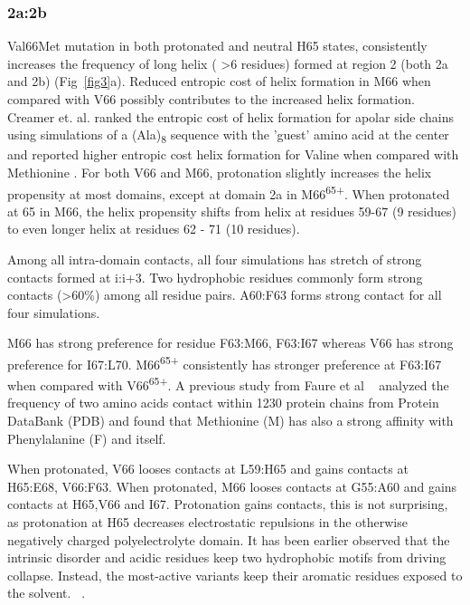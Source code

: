 \documentclass[journal=jacsat,manuscript=article]{achemso}
\begin{document}
\subsubsection{2a:2b}
Val66Met mutation in both protonated and neutral H65 states, consistently increases the frequency of long helix ( \textgreater 6 residues) formed at region 2 (both 2a and 2b) (Fig~\ref{fig3}a). 
Reduced entropic cost of helix formation in M66 when compared with V66 possibly contributes to the increased helix formation. Creamer et. al. ranked the entropic cost of helix formation for apolar side chains using simulations of a (Ala)\textsubscript{8} sequence with the 'guest' amino acid at the center and reported higher entropic cost helix formation for Valine when compared with Methionine \cite{Creamer1992}. 
For both V66 and M66, protonation slightly increases the helix propensity at most domains, except at domain 2a in M66\textsuperscript{65+}. 
When protonated at 65 in M66, the helix propensity shifts from helix at residues 59-67 (9 residues) to  even longer helix at residues 62 - 71 (10 residues).

Among all intra-domain contacts, all four simulations has stretch of strong contacts formed at i:i+3. Two hydrophobic residues commonly form strong contacts (\textgreater 60\%) among all residue pairs. A60:F63 forms strong contact for all four simulations. 

M66 has strong preference for residue F63:M66, F63:I67 whereas V66 has strong preference for I67:L70. M66\textsuperscript{65+} consistently has stronger preference at F63:I67 when compared with V66\textsuperscript{65+}.  A previous study from Faure et al ~\cite {Faure2008} analyzed the frequency of two amino acids contact within 1230 protein chains from Protein DataBank (PDB) and found that Methionine (M) has also a strong affinity with Phenylalanine (F) and itself.

When protonated, V66 looses contacts at L59:H65 and gains contacts at H65:E68, V66:F63. When protonated, M66 looses contacts at G55:A60 and gains contacts at H65,V66 and I67. Protonation gains contacts, this is not surprising, as protonation at H65 decreases electrostatic repulsions in the otherwise negatively charged polyelectrolyte domain. It has been earlier observed that  the intrinsic disorder and acidic residues keep two hydrophobic motifs from driving collapse. Instead, the most-active variants keep their aromatic residues exposed to the solvent. ~\cite {Staller2018}.
\end{document}
